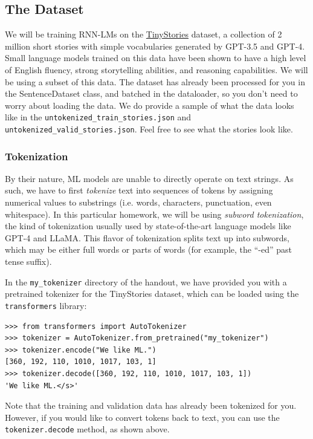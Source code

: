 \documentclass[11pt,addpoints,answers]{exam}
\begin{document}
\subsection{The Dataset}\label{dataset}
We will be training RNN-LMs on the \href{https://huggingface.co/datasets/roneneldan/TinyStories}{TinyStories} dataset, a collection of 2 million short stories with simple vocabularies generated by GPT-3.5 and GPT-4. Small language models trained on this data have been shown to have a high level of English fluency, strong storytelling abilities, and reasoning capabilities. We will be using a subset of this data. The dataset has already been processed for you in the SentenceDataset class, and batched in the dataloader, so you don't need to worry about loading the data. We do provide a sample of what the data looks like in the \texttt{untokenized\_train\_stories.json} and \texttt{untokenized\_valid\_stories.json}. Feel free to see what the stories look like.


\subsubsection{Tokenization}

By their nature, ML models are unable to directly operate on text strings. As such, we have to first \textit{tokenize} text into sequences of tokens by assigning numerical values to substrings (i.e. words, characters, punctuation, even whitespace). 
In this particular homework, we will be using \textit{subword tokenization}, the kind of tokenization usually used by state-of-the-art language models like GPT-4 and LLaMA. This flavor of tokenization splits text up into subwords, which may be either full words or parts of words (for example, the ``-ed'' past tense suffix). 

In the \texttt{my\_tokenizer} directory of the handout, we have provided you with a pretrained tokenizer for the TinyStories dataset, which can be loaded using the \texttt{transformers} library:

\begin{lstlisting}
>>> from transformers import AutoTokenizer
>>> tokenizer = AutoTokenizer.from_pretrained("my_tokenizer")
>>> tokenizer.encode("We like ML.")
[360, 192, 110, 1010, 1017, 103, 1]
>>> tokenizer.decode([360, 192, 110, 1010, 1017, 103, 1])
'We like ML.</s>'
\end{lstlisting}

Note that the training and validation data has already been tokenized for you. However, if you would like to convert tokens back to text, you can use the \texttt{tokenizer.decode} method, as shown above.
\end{document}
